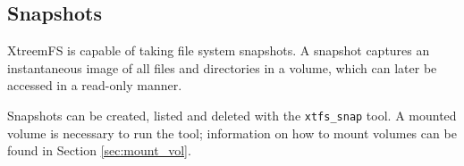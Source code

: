 \documentclass[a4paper,10pt]{book}
\begin{document}
% 
% 
% 
% 
% 

\subsection{Snapshots}

XtreemFS is capable of taking file system snapshots. A snapshot captures an instantaneous image of all files and directories in a volume, which can later be accessed in a read-only manner.

Snapshots can be created, listed and deleted with the \texttt{xtfs\_snap} tool. A mounted volume is necessary to run the tool; information on how to mount volumes can be found in Section \ref{sec:mount_vol}.
\end{document}
